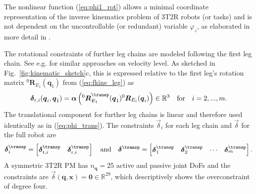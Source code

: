 \documentclass[
	graybox,
	vecphys] %
	{svmult}
\newcommand{\bm}[1]{\boldsymbol{#1}}
\newcommand{\rotmat}[2]{{{ }^{#1}\boldsymbol{R}}_{#2}}
\newcommand{\Res}[0]{\vec{\delta}}
\begin{document}
The nonlinear function (\ref{eq:phi1_rot}) allows a minimal coordinate representation of the inverse kinematics problem of 3T2R robots (or tasks) and is not dependent on the uncontrollable (or redundant) variable $\varphi_z$, as elaborated in more detail in \cite{SchapplerTapOrt2019}.

The rotational constraints of further leg chains are modeled following the first leg chain. 
See e.g. \cite{Gogu2008,BriotKha2015} for similar approaches on velocity level.
As sketched in Fig.~\ref{fig:kinematic_sketch}c, this is expressed relative to the first leg's rotation matrix $\rotmat{0}{E_1}(\bm{q}_1)$ from (\ref{eq:fkine_leg}) as
\vspace{-0.2cm}
\begin{equation}
\Res_{\mathrm{r},i}(\bm{q}_i,\bm{q}_1)
=
\bm{\alpha}\left(\rotmat{0}{E_1}^\transp(\bm{q}_1)\rotmat{0}{E_i}(\bm{q}_i)\right) \in {\mathbb{R}}^{3}
\quad \mathrm{for} \quad i=2,...,m.
\vspace{-0.1cm}
\end{equation}
The translational component for further leg chains is linear and therefore used identically as in (\ref{eq:phi_trans}).
The constraints $\Res_i$ for each leg chain and $\Res$ for the full robot are
\vspace{-0.1cm}
\begin{equation}
\Res_i^\transp=\begin{bmatrix}
\Res_{\mathrm{t},i}^\transp & \Res_{\mathrm{r},i}^\transp
\end{bmatrix}
\quad \mathrm{and} \quad
\Res^\transp
=
\begin{bmatrix}
\Res_1^\transp &
\Res_2^\transp &
\cdots &
\Res_m^\transp
\end{bmatrix}.
\label{eq:constr}
\end{equation}
%
A symmetric 3T2R PM 
has $n_{\bm{q}}{=}25$ active and passive joint DoFs and
the constraints are $\Res(\bm{q},\bm{x}){=}\bm{0} \in {\mathbb{R}}^{29}$, which descriptively shows the overconstraint of degree four.
\end{document}
